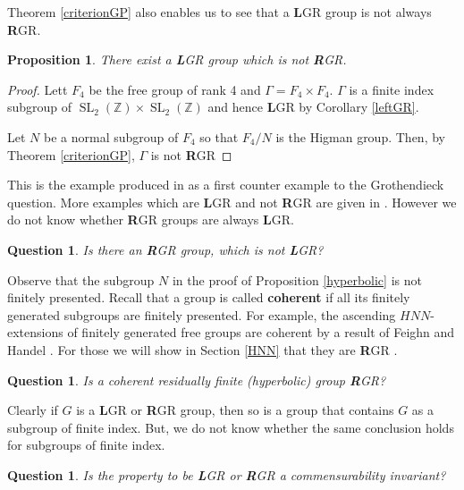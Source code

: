 \documentclass{amsart}
\newtheorem{pro}[lem]{Proposition}
\newtheorem{Question}[Conj]{Question}
\theoremstyle{definition}
\theoremstyle{remark}
\DeclareMathOperator{\SL}{SL}\DeclareMathOperator{\GL}{GL}
\newcommand{\Z}{\mathbb{Z}}
\begin{document}
 Theorem \ref{criterionGP} also enables us to see that a {\textbf L}GR group is not always {\textbf R}GR.
 \begin{pro}\label{f2f2}
 There exist a {\textbf L}GR group which is not {\textbf R}GR.
 \end{pro}
 \begin{proof}
 Lett $F_4$ be  the free group of rank 4 and $\Gamma=F_4\times F_4$.  $\Gamma$ is  a finite index  subgroup of $\SL_2(\Z)\times \SL_2(\Z)$ and hence {\textbf L}GR by Corollary \ref{leftGR}.
 
Let $N$ be a normal subgroup of $F_4$ so that $F_4/N$ is the Higman group. Then, by Theorem \ref{criterionGP},   $\Gamma$ is not {\textbf R}GR   
 \end{proof}
 This is the example produced in \cite{PT86} as a first counter example to the Grothendieck question. More examples which are {\textbf L}GR and not {\textbf R}GR are  given in \cite{BL00}.   However we do not know whether {\textbf R}GR groups are always {\textbf L}GR.   \begin{Question}
  Is there an {\textbf R}GR group, which is not {\textbf L}GR?\end{Question}

 
 
 

 Observe that the subgroup $N$ in the proof of Proposition \ref{hyperbolic} is not finitely presented. Recall that a group is called {\bf coherent} if all its finitely generated subgroups are finitely presented. For example, the ascending $HNN$-extensions of finitely generated free groups  are  coherent  by  a result of Feighn and Handel \cite{FH99}.  For those we will show in Section \ref{HNN} that they are {\textbf R}GR .
 \begin{Question}
 Is a coherent residually finite  (hyperbolic) group {\textbf R}GR?
 \end{Question}																	

 

 Clearly if $G$ is a {\textbf L}GR or  {\textbf R}GR group, then so is a group that contains $G$ as a subgroup of finite index. But, we do not know whether the same conclusion holds for subgroups of finite index.
 \begin{Question}
 Is the property to be {\textbf L}GR or  {\textbf R}GR a commensurability invariant?
 \end{Question}
  
\end{document}
